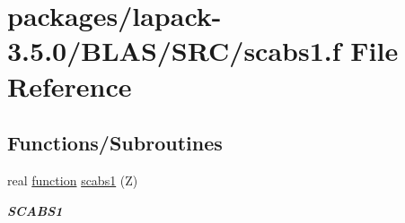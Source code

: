 \hypertarget{lapack-3_85_80_2BLAS_2SRC_2scabs1_8f}{}\section{packages/lapack-\/3.5.0/\+B\+L\+A\+S/\+S\+R\+C/scabs1.f File Reference}
\label{lapack-3_85_80_2BLAS_2SRC_2scabs1_8f}
\subsection*{Functions/\+Subroutines}
\begin{DoxyCompactItemize}
\item 
real \hyperlink{afunc_8m_a7b5e596df91eadea6c537c0825e894a7}{function} \hyperlink{group__single__blas__level1_ga351f01fdf3baa8e6a71d56ded46b126d}{scabs1} (Z)
\begin{DoxyCompactList}\small\item\em {\bfseries S\+C\+A\+B\+S1} \end{DoxyCompactList}\end{DoxyCompactItemize}
